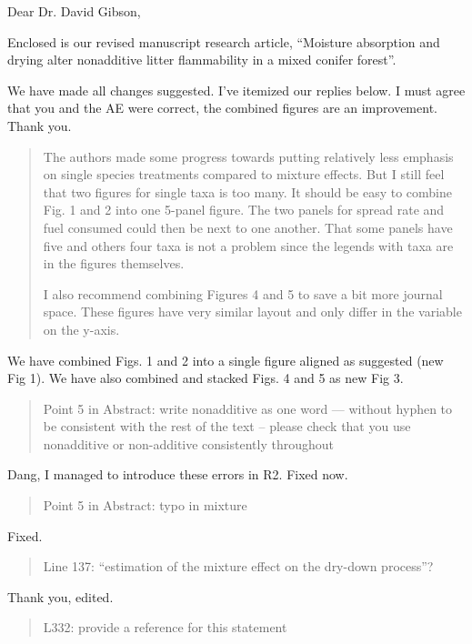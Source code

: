 \documentclass[letterpaper, 12pt]{letter}
\begin{document}
\begin{letter}{}

\opening{Dear Dr. David Gibson,}

Enclosed is our revised manuscript research article, ``Moisture absorption and
drying alter nonadditive litter flammability in a mixed conifer forest''.

We have made all changes suggested. I've itemized our replies below. I must agree that you and the AE were correct, the combined figures are an improvement. Thank you.


\begin{quote}
The authors made some progress towards putting relatively less emphasis on
single species treatments compared to mixture effects. But I still feel that
two figures for single taxa is too many. It should be easy to combine Fig. 1
and 2 into one 5-panel figure. The two panels for spread rate and fuel consumed
could then be next to one another. That some panels have five and others four
taxa is not a problem since the legends with taxa are in the figures
themselves.


I also recommend combining Figures 4 and 5 to save a bit more journal space.
These figures have very similar layout and only differ in the variable on the
y-axis.
\end{quote}

We have combined Figs. 1 and 2 into a single figure aligned as suggested (new Fig 1). We have also combined and stacked Figs. 4 and 5 as new Fig 3.

\begin{quote}
  Point 5 in Abstract: write nonadditive as one word --- without hyphen to be
  consistent with the rest of the text – please check that you use nonadditive or
  non-additive consistently throughout
\end{quote}

Dang, I managed to introduce these errors in R2. Fixed now.

\begin{quote}
Point 5 in Abstract: typo in mixture
\end{quote}

Fixed.

\begin{quote}
  Line 137: ``estimation of the mixture effect on the dry-down process''?
\end{quote}

Thank you, edited.

\begin{quote}
  L332: provide a reference for this statement
\end{quote}


\end{letter}
\end{document}
